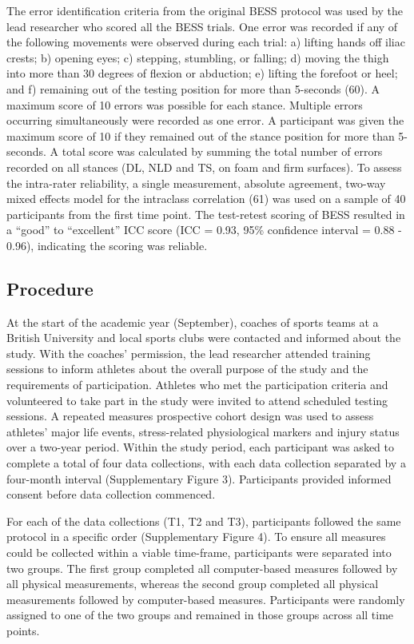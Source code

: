 \documentclass[
  english,
  man]{apa6}
\begin{document}
The error identification criteria from the original BESS protocol was used by the lead researcher who scored all the BESS trials.
One error was recorded if any of the following movements were observed during each trial: a) lifting hands off iliac crests; b) opening eyes; c) stepping, stumbling, or falling; d) moving the thigh into more than 30 degrees of flexion or abduction; e) lifting the forefoot or heel; and f) remaining out of the testing position for more than 5-seconds (60).
A maximum score of 10 errors was possible for each stance.
Multiple errors occurring simultaneously were recorded as one error.
A participant was given the maximum score of 10 if they remained out of the stance position for more than 5-seconds.
A total score was calculated by summing the total number of errors recorded on all stances (DL, NLD and TS, on foam and firm surfaces).
To assess the intra-rater reliability, a single measurement, absolute agreement, two-way mixed effects model for the intraclass correlation (61) was used on a sample of 40 participants from the first time point.
The test-retest scoring of BESS resulted in a ``good'' to ``excellent'' ICC score (ICC = 0.93, 95\% confidence interval = 0.88 - 0.96), indicating the scoring was reliable.

\hypertarget{procedure}{%
\subsection{Procedure}\label{procedure}}

At the start of the academic year (September), coaches of sports teams at a British University and local sports clubs were contacted and informed about the study.
With the coaches' permission, the lead researcher attended training sessions to inform athletes about the overall purpose of the study and the requirements of participation.
Athletes who met the participation criteria and volunteered to take part in the study were invited to attend scheduled testing sessions.
A repeated measures prospective cohort design was used to assess athletes' major life events, stress-related physiological markers and injury status over a two-year period.
Within the study period, each participant was asked to complete a total of four data collections, with each data collection separated by a four-month interval (Supplementary Figure 3).
Participants provided informed consent before data collection commenced.

For each of the data collections (T1, T2 and T3), participants followed the same protocol in a specific order (Supplementary Figure 4).
To ensure all measures could be collected within a viable time-frame, participants were separated into two groups.
The first group completed all computer-based measures followed by all physical measurements, whereas the second group completed all physical measurements followed by computer-based measures.
Participants were randomly assigned to one of the two groups and remained in those groups across all time points.
\end{document}
